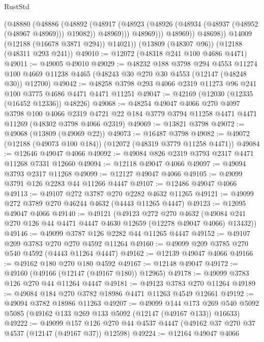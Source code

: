 \begin{lexlean}{RustStd}
\begin{coremodule}
                  (@48880
                    (@48886
                      (@48892
                        (@48917
                          (@48923
                            (@48926 (@48934 (@48937 (@48952 (@48967 @48969))) @19082))
                            @48969)))
                      @48969)))
                @48969))
            @48698))
        @14009
        (@12188 (@16678 @3871 @294))
        @14021))
    (@13809 (@48307 @96))
    (@12188 (@48311 @293 @241))
@49010 := @12072 (@48318 @241 @100 @4686 @4471)
@49011 := @49005 @49010
@49029 := @48232
    @188
    @3798
    @294
    @4553
    @11274
    @100
    @4669
    @11238
    @4465
    (@48243 @30 @270 @30 @4553 (@12147 (@48248 @30)) @12700)
@49042 := @48258 @3798 @293 @4066 @2319 @11273 @96 @241 @100 @3775 @4686 @4471 @4471 @11251
@49047 := @42169 (@12030 (@12335 (@16452 @12336)) @48226)
@49068 := @48254
    @49047
    @4066
    @270
    @4097
    @3798
    @100
    @4066
    @2319
    @4721
    @22
    @184
    @3779
    @3794
    @11258
    @4471
    @4471
    @11269
    (@48302 @3798 @4066 @2319)
@49069 := @13821 @3798
@49072 := @49068 (@13809 (@49069 @22))
@49073 := @16487 @3798
@49082 := @49072 (@12188 (@49073 @100 @184)) (@12072 (@48319 @3779 @11258 @4471))
@49084 := @12646 @49047 @4066
@49092 := @49084 @826 @2319 @3793 @2317 @4471 @11268 @7331 @12660
@49094 := @12118 @49047 @4066
@49097 := @49094 @3793 @2317 @11268
@49099 := @12127 @49047 @4066
@49105 := @49099 @3791 @126 @2283 @44 @11266 @4447
@49107 := @12486 @49047 @4066
@49113 := @49107 @272 @3787 @270 @2282 @4632 @11265
@49121 := @49099 @272 @3789 @270 @46244 @4632 (@4443 @11265 @4447)
@49123 := @12095 @49047 @4066
@49140 := @49121
    (@49123
      @272
      @270
      @4632
      (@49084 @241 @270 @126 @44 @4471 @4447 @4630 @12659 (@12278 @49047 @4066) @13432))
@49146 := @49099 @3787 @126 @2282 @44 @11265 @4447
@49152 := @49107 @209 @3783 @270 @270 @4592 @11264
@49160 := @49099 @209 @3785 @270 @540 @4592 (@4443 @11264 @4447)
@49162 := @12139 @49047 @4066
@49166 := @49162 @180 @270 @180 @4592
@49167 := @12148 @49047
@49172 := @49160 (@49166 (@12147 (@49167 @180)) @12965)
@49178 := @49099 @3783 @126 @270 @44 @11264 @4447
@49181 := @49123 @3783 @270 @11264
@49189 := @49084 @184 @270 @3782 @18986 @4471 @11263 @4549 @12661
@49192 := @49094 @3782 @18986 @11263
@49207 := @49099
    @144
    @173
    @269
    @540
    @5092
    @5085
    (@49162 @133 @269 @133 @5092 (@12147 (@49167 @133)) @16633)
@49222 := @49099
    @157
    @126
    @270
    @44
    @4537
    @4447
    (@49162 @37 @270 @37 @4537 (@12147 (@49167 @37)) @12598)
@49224 := @12164 @49047 @4066

\end{coremodule}
\end{lexlean}
